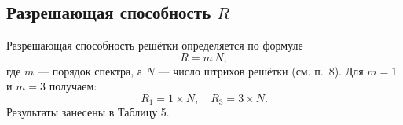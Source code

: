 \subsection*{Разрешающая способность \(R\)}

Разрешающая способность решётки определяется по формуле
\[
	R = m\,N,
\]
где \(m\) — порядок спектра, а \(N\) — число штрихов решётки (см. п.~8).
Для \(m=1\) и \(m=3\) получаем:
\[
	R_1 = 1 \times N,\quad R_3 = 3 \times N.
\]
Результаты занесены в Таблицу 5.

